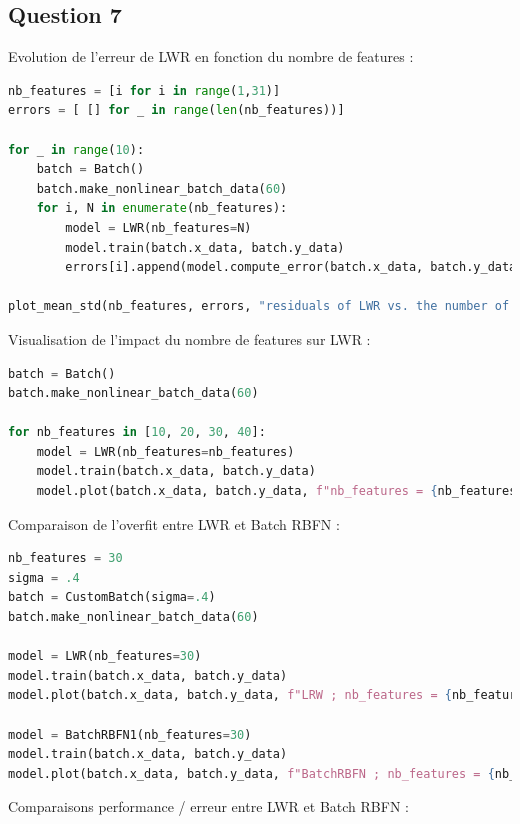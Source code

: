\documentclass[french,12pt]{article}
\begin{document}
\subsection*{Question 7}

\noindent Evolution de l'erreur de LWR en fonction du nombre de features : 
\bigskip
\begin{lstlisting}[language=Python]
nb_features = [i for i in range(1,31)]
errors = [ [] for _ in range(len(nb_features))]

for _ in range(10):
    batch = Batch()
    batch.make_nonlinear_batch_data(60)
    for i, N in enumerate(nb_features):
        model = LWR(nb_features=N)
        model.train(batch.x_data, batch.y_data)
        errors[i].append(model.compute_error(batch.x_data, batch.y_data))

plot_mean_std(nb_features, errors, "residuals of LWR vs. the number of features", "nb_features", "error (residuals)")
\end{lstlisting}
\bigskip

\noindent Visualisation de l'impact du nombre de features sur LWR : 
\bigskip

\begin{lstlisting}[language=Python]
batch = Batch()
batch.make_nonlinear_batch_data(60)

for nb_features in [10, 20, 30, 40]:
    model = LWR(nb_features=nb_features)
    model.train(batch.x_data, batch.y_data)
    model.plot(batch.x_data, batch.y_data, f"nb_features = {nb_features}")
\end{lstlisting}
\bigskip

\noindent Comparaison de l'overfit entre LWR et Batch RBFN : 
\bigskip

\begin{lstlisting}[language=Python]
nb_features = 30
sigma = .4
batch = CustomBatch(sigma=.4)
batch.make_nonlinear_batch_data(60)

model = LWR(nb_features=30)
model.train(batch.x_data, batch.y_data)
model.plot(batch.x_data, batch.y_data, f"LRW ; nb_features = {nb_features}, sigma = {sigma}")

model = BatchRBFN1(nb_features=30)
model.train(batch.x_data, batch.y_data)
model.plot(batch.x_data, batch.y_data, f"BatchRBFN ; nb_features = {nb_features}, sigma = {sigma}", gaussians=False)
\end{lstlisting}
\bigskip

\noindent Comparaisons performance / erreur entre LWR et Batch RBFN : 
\bigskip
\end{document}
